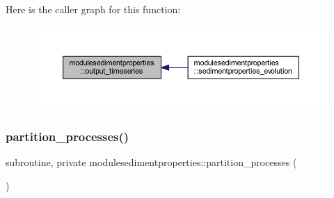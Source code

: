 Here is the caller graph for this function\+:\nopagebreak
\begin{figure}[H]
\begin{center}
\leavevmode
\includegraphics[width=350pt]{namespacemodulesedimentproperties_a45f67a80f9c968c6138d9eeef961a523_icgraph}
\end{center}
\end{figure}
\mbox{\label{namespacemodulesedimentproperties_a28bead70b224e32b9105e7f44858867d}} 
\subsubsection{\texorpdfstring{partition\+\_\+processes()}{partition\_processes()}}
{\footnotesize\ttfamily subroutine, private modulesedimentproperties\+::partition\+\_\+processes (\begin{DoxyParamCaption}{ }\end{DoxyParamCaption})\hspace{0.3cm}{\ttfamily [private]}}

